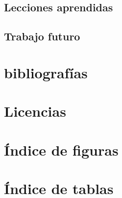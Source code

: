 \documentclass[12pt,letterpaper]{report}
\begin{document}
	\subsection{Lecciones aprendidas}
	\subsection{Trabajo futuro}

\section{bibliografías}

\section{Licencias}

\section{Índice de figuras}

\section{Índice de tablas}
\end{document}
